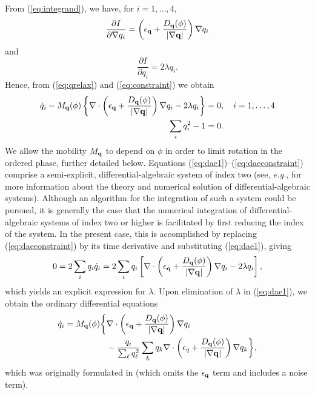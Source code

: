 From (\ref{eq:integrand}), we have, for $i=1,\ldots,4$,
%
\begin{equation}
  \frac{\partial I}{\partial \nabla q_i} =
    \left ( \epsilon_{\bf q} + \frac{D_{\bf q}(\phi) }{| \nabla {\bf q} |} \right )
    \nabla q_i
\label{eq:didnq}
\end{equation}
%
and
%
\begin{equation}
  \frac{\partial I}{\partial q_i} = 2 \lambda q_i.
\label{eq:didq}
\end{equation}
%
Hence, from (\ref{eq:qrelax}) and (\ref{eq:constraint}) we obtain
%
\begin{align}
  \dot{q}_i - M_{\bf q} (\phi) \left \{ \nabla \cdot \left ( \epsilon_{\bf q} +
    \frac{D_{\bf q}(\phi)}{| \nabla {\bf q} |} \right ) \nabla q_i - 2 \lambda
    q_i \right \} & = 0, \hspace{1em} i=1,\ldots,4
\label{eq:dae1} \\
  \sum_i q_i^2 - 1 & = 0.
\label{eq:daeconstraint}
\end{align}
%
We allow the mobility $M_{\bf q}$ to depend on $\phi$ in order to
limit rotation in the ordered phase, further detailed below.
Equations (\ref{eq:dae1})--(\ref{eq:daeconstraint}) comprise a
semi-explicit, differential-algebraic system of index two (see, {\em
e.g.}, \cite{BCP89} for more information about the theory and
numerical solution of differential-algebraic systems).  Although an
algorithm for the integration of such a system could be pursued, it is
generally the case that the numerical integration of
differential-algebraic systems of index two or higher is facilitated
by first reducing the index of the system.  In the present case, this
is accomplished by replacing (\ref{eq:daeconstraint}) by its time
derivative and substituting (\ref{eq:dae1}), giving
%
\begin{equation}
  0 = 2 \sum_i q_i \dot{q}_i =
    2 \sum_i q_i \left[ \nabla \cdot \left( \epsilon_{\bf q} +
    \frac{D_{\bf q}(\phi) }{| \nabla {\bf q} |} \right)
    \nabla q_i - 2 \lambda q_i \right],
\label{eq:difcon}
\end{equation}
%
which yields an explicit expression for $\lambda$.  Upon elimination
of $\lambda$ in (\ref{eq:dae1}), we obtain the ordinary differential
equations
%
\begin{equation}
\begin{split}
  \dot{q}_i = M_{\bf q}(\phi) \bigg \{
    & \nabla \cdot \left (
    \epsilon_{\bf q} +  \frac{D_{\bf q}(\phi)}{| \nabla {\bf q} |} \right )
    \nabla q_i \\
    & - \frac{q_i}{\sum_\ell q_\ell^2} \sum_k q_k \nabla \cdot
    \left ( \epsilon_q +  \frac{D_{\bf q}(\phi)}{ | \nabla {\bf q} |} \right )
    \nabla q_k \bigg \},
\label{eq:qeom}
\end{split}
\end{equation}
%
which was originally formulated in \cite{0295-5075-71-1-131} (which
omits the $\epsilon_{\bf q}$ term and includes a noise term).

